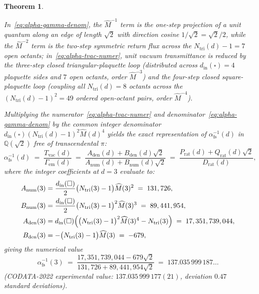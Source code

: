 \documentclass[11pt,a4paper]{article}
\theoremstyle{plain}
\newtheorem{theorem}{Theorem}[section]
\theoremstyle{definition}
\begin{document}
\begin{theorem}
\begin{enumerate}[label=\textbf{(\arabic*)},leftmargin=*]
  In~\eqref{eq:alpha-gamma-denom}, the $\widehat{M}^{-1}$ term is the one-step projection of a unit quantum along an edge of length $\sqrt{2}$ with direction cosine $1/\sqrt{2} = \sqrt{2}/2$, while the $\widehat{M}^{-2}$ term is the two-step symmetric return flux across the $N_{\mathrm{tri}}(d) - 1 = 7$ open octants; in~\eqref{eq:alpha-tvac-numer}, unit vacuum transmittance is reduced by the three-step closed triangular-plaquette loop (distributed across $d_{\mathrm{in}}(\square) = 4$ plaquette sides and $7$ open octants, order $\widehat{M}^{-3}$) and the four-step closed square-plaquette loop (coupling all $N_{\mathrm{tri}}(d) = 8$ octants across the $(N_{\mathrm{tri}}(d) - 1)^2 = 49$ ordered open-octant pairs, order $\widehat{M}^{-4}$).

  Multiplying the numerator~\eqref{eq:alpha-tvac-numer} and denominator~\eqref{eq:alpha-gamma-denom} by the common integer denominator $d_{\mathrm{in}}(\square)(N_{\mathrm{tri}}(d) - 1)^2\widehat{M}(d)^4$ yields the exact representation of $\alpha_{\mathrm{fs}}^{-1}(d)$ in $\mathbb{Q}(\sqrt{2})$ free of transcendental $\pi$:
  \begin{equation}
    \label{eq:alpha-fs-137}
    \alpha_{\mathrm{fs}}^{-1}(d) \;=\; \frac{T_{\mathrm{vac}}(d)}{\Gamma_{\mathrm{em}}(d)} \;=\; \frac{A_{\mathrm{den}}(d) + B_{\mathrm{den}}(d)\sqrt{2}}{A_{\mathrm{num}}(d) + B_{\mathrm{num}}(d)\sqrt{2}} \;=\; \frac{P_{\mathrm{rat}}(d) + Q_{\mathrm{rat}}(d)\sqrt{2}}{D_{\mathrm{rat}}(d)},
  \end{equation}
  where the integer coefficients at $d = 3$ evaluate to:
  \begin{align}
    A_{\mathrm{num}}(3) &= \frac{d_{\mathrm{in}}(\square)}{2}\bigl(N_{\mathrm{tri}}(3) - 1\bigr)\widehat{M}(3)^2 \;=\; 131,726, \label{eq:alpha-anum} \\
    B_{\mathrm{num}}(3) &= \frac{d_{\mathrm{in}}(\square)}{2}\bigl(N_{\mathrm{tri}}(3) - 1\bigr)^2\widehat{M}(3)^3 \;=\; 89,441,954, \label{eq:alpha-bnum} \\
    A_{\mathrm{den}}(3) &= d_{\mathrm{in}}(\square)\Bigl(\bigl(N_{\mathrm{tri}}(3) - 1\bigr)^2\widehat{M}(3)^4 - N_{\mathrm{tri}}(3)\Bigr) \;=\; 17,351,739,044, \label{eq:alpha-aden} \\
    B_{\mathrm{den}}(3) &= -\bigl(N_{\mathrm{tri}}(3) - 1\bigr)\widehat{M}(3) \;=\; -679, \label{eq:alpha-bden}
  \end{align}
  giving the numerical value
  \begin{equation}
    \label{eq:alpha-numeric-codata}
    \alpha_{\mathrm{fs}}^{-1}(3) \;=\; \frac{17,351,739,044 - 679\sqrt{2}}{131,726 + 89,441,954\sqrt{2}} \;=\; 137.035\,999\,187\dots
  \end{equation}
  (CODATA-2022 experimental value: $137.035\,999\,177(21)$, deviation $0.47$ standard deviations).


\end{enumerate}
\end{theorem}
\end{document}
